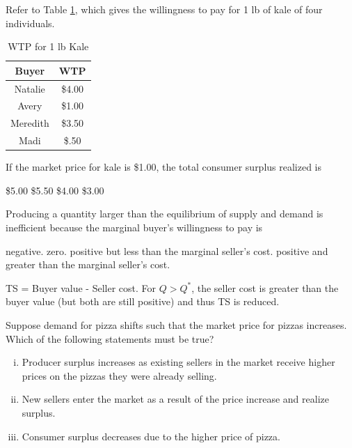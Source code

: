 \documentclass[addpoints,11pt]{exam}
\theoremstyle{definition}
\begin{document}
\begin{questions}
	
	\question Refer to Table \ref{kale}, which gives the willingness to pay for 1 lb of kale of four individuals.
	
	\begin{table}[H]
		\caption{WTP for 1 lb Kale}
		\centering
		\begin{tabular}{ c| c}        
			
			\hspace{1cm} Buyer \hspace{1cm}   & \hspace{1cm} WTP \hspace{1cm} \\
			\hline
			Natalie & \$4.00 \\
			Avery & \$1.00 \\
			Meredith & \$3.50 \\
			Madi & \$.50 \\
		\end{tabular}
		\label{kale}
	\end{table} 
	
	If the market price for kale is \$1.00, the total consumer surplus realized is
	
	\begin{choices}
		\choice \$5.00
		\CorrectChoice \$5.50
		\choice \$4.00
		\choice \$3.00
	\end{choices}	


	
	\question Producing a quantity larger than the equilibrium of supply and demand is inefficient because the marginal buyer's willingness to pay is
	
	\begin{choices}
		\choice negative.
		\choice zero.
		\CorrectChoice positive but less than the marginal seller's cost.
		\choice positive and greater than the marginal seller's cost.
	\end{choices}
	
	\begin{solution}
		TS = Buyer value - Seller cost. For $Q>Q^*$, the seller cost is greater than the buyer value (but both are still positive) and thus TS is reduced.
	\end{solution}


	\question Suppose demand for pizza shifts such that the market price for pizzas increases. Which of the following statements must be true?
	
	\begin{enumerate}[i.]
		\item Producer surplus increases as existing sellers in the market receive higher prices on the pizzas they were already selling.
		\item New sellers enter the market as a result of the price increase and realize surplus.
		\item Consumer surplus decreases due to the higher price of pizza.
	\end{enumerate}
	

\end{questions}
\end{document}
